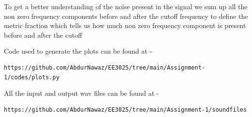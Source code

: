 \documentclass[journal,12pt,twocolumn]{IEEEtran}
\begin{document}
To get a better understanding of the noise present in the signal we sum up all the non zero frequency
components before and after the cutoff frequency to define the metric fraction which tells us how much non zero frequency component is present before and after the cutoff

Code used to generate the plots can be found at - 
\begin{lstlisting}
https://github.com/AbdurNawaz/EE3025/tree/main/Assignment-1/codes/plots.py
\end{lstlisting}


All the input and output wav files can be found at -
\begin{lstlisting}
https://github.com/AbdurNawaz/EE3025/tree/main/Assignment-1/soundfiles
\end{lstlisting}
\end{document}
